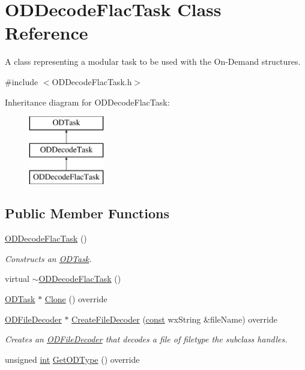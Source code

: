\hypertarget{class_o_d_decode_flac_task}{}\section{O\+D\+Decode\+Flac\+Task Class Reference}
\label{class_o_d_decode_flac_task}


A class representing a modular task to be used with the On-\/\+Demand structures.  




{\ttfamily \#include $<$O\+D\+Decode\+Flac\+Task.\+h$>$}

Inheritance diagram for O\+D\+Decode\+Flac\+Task\+:\begin{figure}[H]
\begin{center}
\leavevmode
\includegraphics[height=3.000000cm]{class_o_d_decode_flac_task}
\end{center}
\end{figure}
\subsection*{Public Member Functions}
\begin{DoxyCompactItemize}
\item 
\hyperlink{class_o_d_decode_flac_task_a1e60a16ea11462eec6c7c20caa0a5e8f}{O\+D\+Decode\+Flac\+Task} ()
\begin{DoxyCompactList}\small\item\em Constructs an \hyperlink{class_o_d_task}{O\+D\+Task}. \end{DoxyCompactList}\item 
virtual \hyperlink{class_o_d_decode_flac_task_a041c482e1f5ce6d0da22c141be37cbd8}{$\sim$\+O\+D\+Decode\+Flac\+Task} ()
\item 
\hyperlink{class_o_d_task}{O\+D\+Task} $\ast$ \hyperlink{class_o_d_decode_flac_task_a0b50d8c210d57df89501a5c1326adbeb}{Clone} () override
\item 
\hyperlink{class_o_d_file_decoder}{O\+D\+File\+Decoder} $\ast$ \hyperlink{class_o_d_decode_flac_task_a38cdeb6c1f0e04482c6fe0d3cd36d2be}{Create\+File\+Decoder} (\hyperlink{getopt1_8c_a2c212835823e3c54a8ab6d95c652660e}{const} wx\+String \&file\+Name) override
\begin{DoxyCompactList}\small\item\em Creates an \hyperlink{class_o_d_file_decoder}{O\+D\+File\+Decoder} that decodes a file of filetype the subclass handles. \end{DoxyCompactList}\item 
unsigned \hyperlink{xmltok_8h_a5a0d4a5641ce434f1d23533f2b2e6653}{int} \hyperlink{class_o_d_decode_flac_task_a0bd73865d880d0be2bc43e94cb1e24ad}{Get\+O\+D\+Type} () override
\end{DoxyCompactItemize}
